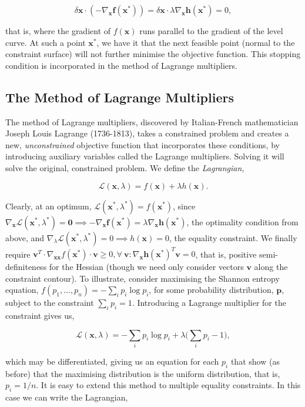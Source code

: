 \documentclass[11pt]{amsart}
\begin{document}
$$\delta\mathbf{x}\cdot(-\nabla_{\mathbf{x}}\mathbf{f}(\mathbf{x}^*)) = \delta\mathbf{x}\cdot\lambda\nabla_{\mathbf{x}}\mathbf{h}(\mathbf{x}^*) = 0,$$

that is, where the gradient of $f(\mathbf{x})$ runs parallel to the gradient of the level curve. At such a point $\mathbf{x}^*$, we have it that the next feasible point (normal to the constraint surface) will not further minimise the objective function. This stopping condition is incorporated in the method of Lagrange multipliers.

\subsection{The Method of Lagrange Multipliers}

The method of Lagrange multipliers, discovered by Italian-French mathematician Joseph Louis Lagrange (1736-1813), takes a constrained problem and creates a new, \emph{unconstrained} objective function that incorporates these conditions, by introducing auxiliary variables called the Lagrange multipliers. Solving it will solve the original, constrained problem. We define the \emph{Lagrangian},

$$\mathcal{L}(\mathbf{x}, \lambda) = f(\mathbf{x}) + \lambda h(\mathbf{x}).$$

Clearly, at an optimum, $\mathcal{L}(\mathbf{x}^*, \lambda^*) = f(\mathbf{x}^*)$, since $\nabla_{\mathbf{x}}\mathcal{L}(\mathbf{x}^*, \lambda^*) = \mathbf{0} \implies -\nabla_{\mathbf{x}}\mathbf{f}(\mathbf{x}^*) = \lambda\nabla_{\mathbf{x}}\mathbf{h}(\mathbf{x}^*)$, the optimality condition from above, and $\nabla_{\lambda}\mathcal{L}(\mathbf{x}^*, \lambda^*) = 0 \implies h(\mathbf{x}) = 0$, the equality constraint. We finally require $\mathbf{v}^T\cdot\nabla_{\mathbf{xx}}f(\mathbf{x}^*)\cdot\mathbf{v} \geq 0, \forall \ \mathbf{v} : \nabla_{\mathbf{x}}\mathbf{h}(\mathbf{x}^*)^T\mathbf{v} = 0$, that is, positive semi-definiteness for the Hessian (though we need only consider vectors $\mathbf{v}$ along the constraint contour). To illustrate, consider maximising the Shannon entropy equation, $f(p_1, \dots, p_n) = -\sum_i p_i \log p_i$, for some probability distribution, $\mathbf{p}$, subject to the constraint $\sum_i p_i = 1$. Introducing a Lagrange multiplier for the constraint gives us,

$$\mathcal{L}(\mathbf{x}, \lambda) =  -\sum_i p_i \log p_i + \lambda\bigg(\sum_i p_i - 1\bigg),$$

which may be differentiated, giving us an equation for each $p_i$ that show (as before) that the maximising distribution is the uniform distribution, that is, $p_i = 1/n$. It is easy to extend this method to multiple equality constraints. In this case we can write the Lagrangian,
\end{document}
